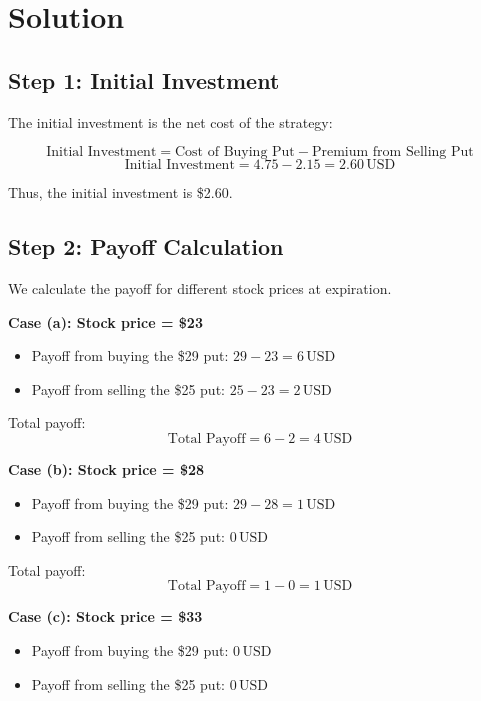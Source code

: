 \documentclass[12pt,letterpaper, onecolumn]{exam}
\begin{document}
\section*{Solution}

\subsection*{Step 1: Initial Investment}

The initial investment is the net cost of the strategy:

\[
\text{Initial Investment} = \text{Cost of Buying Put} - \text{Premium from Selling Put}
\]
\[
\text{Initial Investment} = 4.75 - 2.15 = 2.60 \, \text{USD}
\]

Thus, the initial investment is \$2.60.

\subsection*{Step 2: Payoff Calculation}

We calculate the payoff for different stock prices at expiration.

\textbf{Case (a): Stock price = \$23}

\begin{itemize}
    \item Payoff from buying the \$29 put: \( 29 - 23 = 6 \, \text{USD} \)
    \item Payoff from selling the \$25 put: \( 25 - 23 = 2 \, \text{USD} \)
\end{itemize}

Total payoff:
\[
\text{Total Payoff} = 6 - 2 = 4 \, \text{USD}
\]

\textbf{Case (b): Stock price = \$28}

\begin{itemize}
    \item Payoff from buying the \$29 put: \( 29 - 28 = 1 \, \text{USD} \)
    \item Payoff from selling the \$25 put: \( 0 \, \text{USD} \)
\end{itemize}

Total payoff:
\[
\text{Total Payoff} = 1 - 0 = 1 \, \text{USD}
\]

\textbf{Case (c): Stock price = \$33}

\begin{itemize}
    \item Payoff from buying the \$29 put: \( 0 \, \text{USD} \)
    \item Payoff from selling the \$25 put: \( 0 \, \text{USD} \)
\end{itemize}
\end{document}
